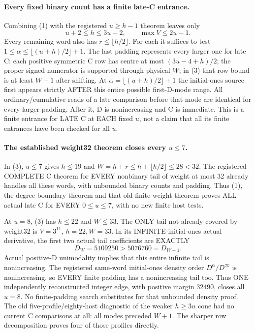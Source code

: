 \paragraph{Every fixed binary count has a finite late-C entrance.}
Combining (1) with the registered $u\ge h-1$ theorem leaves only
\[
 u+2\le h\le3u-2,\qquad\max V\le2u-1.               \tag{3}
\]
Every remaining word also has $r\le\lfloor h/2\rfloor$.
For each it suffices to test
$1\le\alpha\le\lfloor(u+h)/2\rfloor+1$.
The last padding represents every larger one for late C: each
positive symmetric C row has centre at most $(3u-4+h)/2$;
the proper signed numerator is supported through physical $W$;
in (3) that row bound is at least $W+1$ after shifting. At
$\alpha=\lfloor(u+h)/2\rfloor+1$ the initial-ones source first
appears strictly AFTER this entire possible first-D-mode range.
All ordinary/cumulative reads of a late comparison before that
mode are identical for every larger padding. After it, D is
nonincreasing and C is immediate.
This is a finite entrance for LATE C at EACH fixed $u$, not a
claim that all its finite entrances have been checked for all $u$.

\paragraph{The established weight32 theorem closes every $u\le7$.}
In (3), $u\le7$ gives $h\le19$ and
$W=h+r\le h+\lfloor h/2\rfloor\le28<32$.
The registered COMPLETE C theorem for EVERY nonbinary tail of weight
at most 32 already handles all these words, with unbounded binary
counts and padding. Thus (1), the degree-boundary theorem and that
old finite-weight theorem proves ALL actual late C for EVERY
$0\le u\le7$, with no new finite host tests.

At $u=8$, (3) has $h\le22$ and $W\le33$.
The ONLY tail not already covered by weight32 is $V=3^{11}$,
$h=22,W=33$. In its INFINITE-initial-ones actual derivative,
the first two actual tail coefficients are EXACTLY
\[
                 D_W=5109250>5076760=D_{W+1}.
\]
Actual positive-D unimodality implies that this entire infinite
tail is nonincreasing. The registered same-word initial-ones density
order $D^\alpha/D^\infty$ is nonincreasing, so EVERY finite padding
has a nonincreasing tail too. Thus ONE independently reconstructed
integer edge, with positive margin 32490, closes all $u=8$.
No finite-padding search substitutes for that unbounded density proof.
The old five-profile/eighty-host diagnostic of the weaker $h\ge3u$
cone had no current C comparisons at all: all modes preceded $W+1$.
The sharper row decomposition proves four of those profiles directly.

